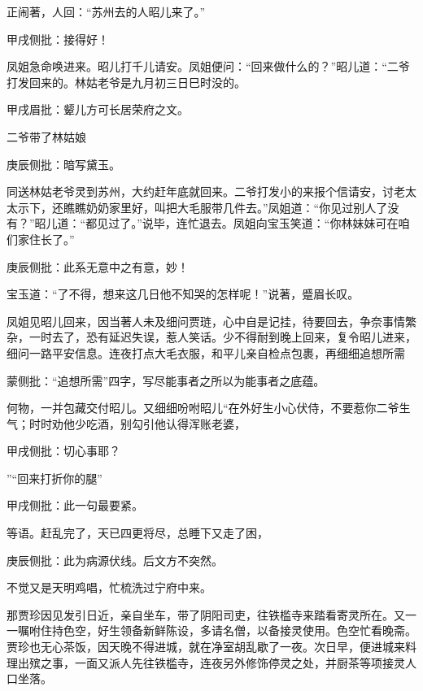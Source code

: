 \begin{parag}
    正闹著，人回：“苏州去的人昭儿来了。”\begin{note}甲戌侧批：接得好！\end{note}凤姐急命唤进来。昭儿打千儿请安。凤姐便问：“回来做什么的？”昭儿道：“二爷打发回来的。林姑老爷是九月初三日巳时没的。\begin{note}甲戌眉批：颦儿方可长居荣府之文。\end{note}二爷带了林姑娘\begin{note}庚辰侧批：暗写黛玉。\end{note}同送林姑老爷灵到苏州，大约赶年底就回来。二爷打发小的来报个信请安，讨老太太示下，还瞧瞧奶奶家里好，叫把大毛服带几件去。”凤姐道：“你见过别人了没有？”昭儿道：“都见过了。”说毕，连忙退去。凤姐向宝玉笑道：“你林妹妹可在咱们家住长了。”\begin{note}庚辰侧批：此系无意中之有意，妙！\end{note}宝玉道：“了不得，想来这几日他不知哭的怎样呢！”说著，蹙眉长叹。
\end{parag}


\begin{parag}
    凤姐见昭儿回来，因当著人未及细问贾琏，心中自是记挂，待要回去，争奈事情繁杂，一时去了，恐有延迟失误，惹人笑话。少不得耐到晚上回来，复令昭儿进来，细问一路平安信息。连夜打点大毛衣服，和平儿亲自检点包裹，再细细追想所需\begin{note}蒙侧批：“追想所需”四字，写尽能事者之所以为能事者之底蕴。\end{note}何物，一并包藏交付昭儿。又细细吩咐昭儿“在外好生小心伏侍，不要惹你二爷生气；时时劝他少吃酒，别勾引他认得浑账老婆，\begin{note}甲戌侧批：切心事耶？\end{note}”“回来打折你的腿”\begin{note}甲戌侧批：此一句最要紧。\end{note}等语。赶乱完了，天已四更将尽，总睡下又走了困，\begin{note}庚辰侧批：此为病源伏线。后文方不突然。\end{note}不觉又是天明鸡唱，忙梳洗过宁府中来。
\end{parag}


\begin{parag}
    那贾珍因见发引日近，亲自坐车，带了阴阳司吏，往铁槛寺来踏看寄灵所在。又一一嘱咐住持色空，好生领备新鲜陈设，多请名僧，以备接灵使用。色空忙看晚斋。贾珍也无心茶饭，因天晚不得进城，就在净室胡乱歇了一夜。次日早，便进城来料理出殡之事，一面又派人先往铁槛寺，连夜另外修饰停灵之处，并厨茶等项接灵人口坐落。
\end{parag}


